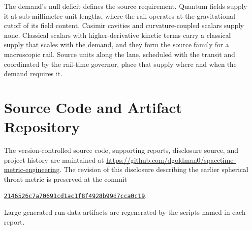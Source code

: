 \documentclass[11pt]{article}
\begin{document}
The demand's null deficit defines the source requirement. Quantum fields supply it at sub-millimetre unit lengths, where the rail operates at the gravitational cutoff of its field content. Casimir cavities and curvature-coupled scalars supply none. Classical scalars with higher-derivative kinetic terms carry a classical supply that scales with the demand, and they form the source family for a macroscopic rail. Source units along the lane, scheduled with the transit and coordinated by the rail-time governor, place that supply where and when the demand requires it.

\section{Source Code and Artifact Repository}

The version-controlled source code, supporting reports, disclosure source, and project history are maintained at
\href{https://github.com/dgoldman0/spacetime-metric-engineering}{https://github.com/dgoldman0/spacetime-metric-engineering}.
The revision of this disclosure describing the earlier spherical throat metric is preserved at the commit
\begin{center}
\href{https://github.com/dgoldman0/spacetime-metric-engineering/tree/2146526c7a70691cd1ac1f8f4928b99d7cca0c19}{\texttt{2146526c7a70691cd1ac1f8f4928b99d7cca0c19}}.
\end{center}
Large generated run-data artifacts are regenerated by the scripts named in each report.
\end{document}
